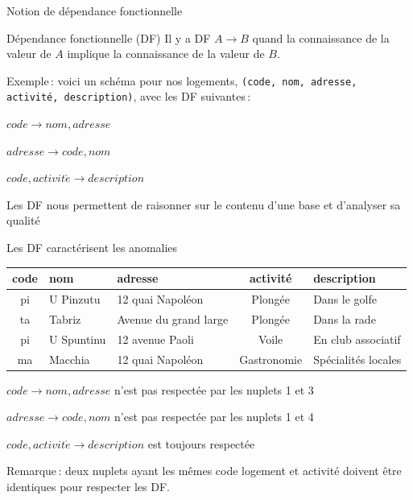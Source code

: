 
\begin{frame}{Notion de dépendance fonctionnelle}

\begin{defblock}{Dépendance fonctionnelle (DF)}
Il y a \alert{DF} $A \to B$ 
quand la connaissance de la valeur de $A$ implique la connaissance de la valeur de $B$.
\end{defblock}
\vfill 
Exemple\,: voici un schéma pour nos logements, \texttt{(code, nom, adresse, activité, description)},
avec les DF suivantes\,:

\vfill
\begin{redbullet}
  \item $code \to nom, adresse$
  \item $adresse \to code, nom$
 \item $code, activit\acute{e}  \to  description$
\end{redbullet}

\vfill

Les DF nous permettent de \alert{raisonner} sur le contenu d'une base et d'analyser sa qualité
\end{frame}


\begin{frame}{Les DF caractérisent les anomalies}
 
\begin{footnotesize}
\begin{tabular}{c|l|p{3.5cm}|c|p{4cm}}
\textbf{code} & \textbf{nom} & \textbf{adresse} & \textbf{activité}& \textbf{description} \\ \hline
   pi & U Pinzutu &  12 quai Napoléon & Plongée & Dans le golfe\\
   ta & Tabriz & Avenue du grand large & Plongée & Dans la rade\\
   pi & U Spuntinu &  12 avenue Paoli  & Voile & En club associatif\\
   ma & Macchia &  12 quai Napoléon & Gastronomie & Spécialités locales\\
\hline
\end{tabular}
\end{footnotesize}

\vfill
\begin{redbullet}
\item $code \to nom, adresse$ n'est pas respectée par les nuplets 1 et 3
    \item $adresse \to code, nom$ n'est pas respectée 
    par les nuplets 1 et 4
\item $code, activit\acute{e}  \to  description$ est toujours respectée
\end{redbullet}

\vfill

\alert{Remarque}\,: deux nuplets ayant les mêmes code logement 
et activité doivent être \alert{identiques} pour respecter les DF.
\end{frame}

